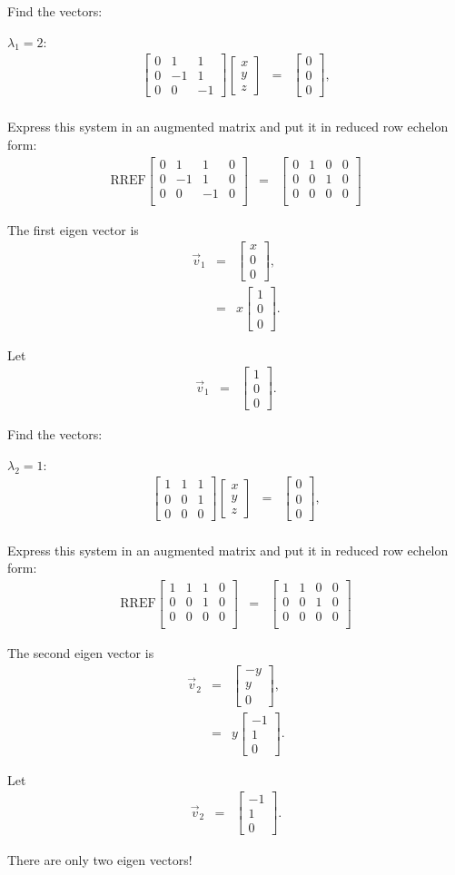 \documentclass{beamer}
\newcommand{\vecThree}[3]{
  \left[
  \begin{array}{r}
    #1 \\  #2 \\ #3
  \end{array}
  \right]
}
\newcommand{\arrayThree}[9]{
  \left[
    \begin{array}{rrr}
      #1 & #2 & #3 \\
      #4 & #5 & #6 \\
      #7 & #8 & #9
    \end{array}
  \right]
}
\newcommand{\startRowFour}{
  \left[
    \begin{array}{rrr|r}
}
\newcommand{\oneRowFour}[4] {
      #1 & #2 & #3 & #4 \\
}
\newcommand{\stopRowOps}{
    \end{array}
  \right]
}
\begin{document}
\begin{frame}
  Find the vectors:

  $\lambda_1 = 2$:
  \begin{eqnarray*}
    \arrayThree{0}{1}{1}{0}{-1}{1}{0}{0}{-1}\vecThree{x}{y}{z} & = & \vecThree{0}{0}{0}, \\
  \end{eqnarray*}

  Express this system in an augmented matrix and put it in reduced row
  echelon form:
  \begin{eqnarray*}
    \mathrm{RREF}\startRowFour
    \oneRowFour{0}{1}{1}{0} 
    \oneRowFour{0}{-1}{1}{0}
    \oneRowFour{0}{0}{-1}{0}
    \stopRowOps
    & = & 
    \startRowFour
    \oneRowFour{0}{1}{0}{0} 
    \oneRowFour{0}{0}{1}{0}
    \oneRowFour{0}{0}{0}{0}
    \stopRowOps
  \end{eqnarray*}


\end{frame}

\begin{frame}
  The first eigen vector is 
  \begin{eqnarray*}
    \vec{v}_1 & = & \vecThree{x}{0}{0}, \\
    & = & x \vecThree{1}{0}{0}.
  \end{eqnarray*}

  Let
  \begin{eqnarray*}
    \vec{v}_1 & = & \vecThree{1}{0}{0}.
  \end{eqnarray*}

\end{frame}

\begin{frame}
  Find the vectors:

  $\lambda_2 = 1$:
  \begin{eqnarray*}
    \arrayThree{1}{1}{1}{0}{0}{1}{0}{0}{0}
    \vecThree{x}{y}{z} & = & \vecThree{0}{0}{0}, \\
  \end{eqnarray*}

  Express this system in an augmented matrix and put it in reduced row
  echelon form:
  \begin{eqnarray*}
    \mathrm{RREF}\startRowFour
    \oneRowFour{1}{1}{1}{0} 
    \oneRowFour{0}{0}{1}{0}
    \oneRowFour{0}{0}{0}{0}
    \stopRowOps
    & = & 
    \startRowFour
    \oneRowFour{1}{1}{0}{0} 
    \oneRowFour{0}{0}{1}{0}
    \oneRowFour{0}{0}{0}{0}
    \stopRowOps
  \end{eqnarray*}

\end{frame}

\begin{frame}

  The second eigen vector is 
  \begin{eqnarray*}
    \vec{v}_2 & = & \vecThree{-y}{y}{0}, \\
    & = & y \vecThree{-1}{1}{0}.
  \end{eqnarray*}

  Let
  \begin{eqnarray*}
    \vec{v}_2 & = & \vecThree{-1}{1}{0}.
  \end{eqnarray*}

  There are only two eigen vectors!

\end{frame}
\end{document}

